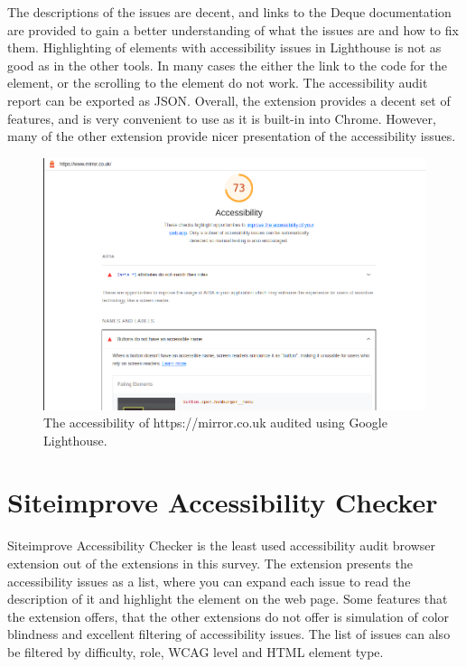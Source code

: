 The descriptions of the issues are decent, and links to the Deque documentation are provided to gain a better understanding of what the issues are and how to fix them.
Highlighting of elements with accessibility issues in Lighthouse is not as good as in the other tools.
In many cases the either the link to the code for the element, or the scrolling to the element do not work.
The accessibility audit report can be exported as JSON.
Overall, the extension provides a decent set of features, and is very convenient to use as it is built-in into Chrome.
However, many of the other extension provide nicer presentation of the accessibility issues.


\begin{figure}[h]
\centering
\includegraphics[keepaspectratio,width=\linewidth,height=\halfh]
{images/lighthouse-ext.png}

\caption[Google Lighthouse]{
The accessibility of https://mirror.co.uk audited using Google Lighthouse.
}
\label{fig:lighthouse-ext}
\end{figure}

\section{Siteimprove Accessibility Checker}
Siteimprove Accessibility Checker \parencite{siteimprove} is the least used accessibility audit browser extension out of the extensions in this survey.
The extension presents the accessibility issues as a list, where you can expand each issue to read the description of it and highlight the element on the web page.
Some features that the extension offers, that the other extensions do not offer is simulation of color blindness and excellent filtering of accessibility issues.
The list of issues can also be filtered by difficulty, role, WCAG level and HTML element type.

